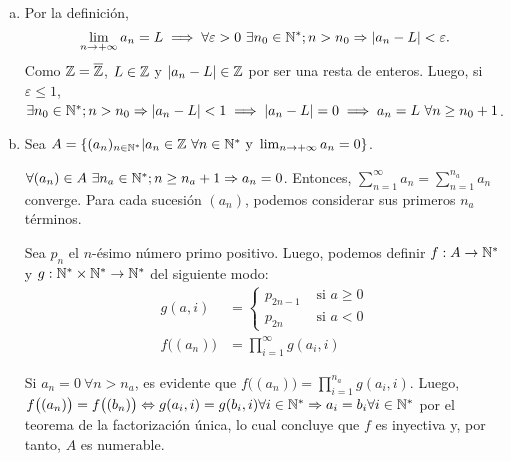 
\hfill

\begin{enumerate}[a)]
	
	\item
		Por la definición,
		$$\limite{n}{a_n}=L \implies \forall\varepsilon>0\ \exists n_0\in\N; n>n_0\Rightarrow |a_n-L|<\varepsilon .$$
		Como $\mathbb{Z}=\overline{\mathbb{Z}}$, $L\in\mathbb{Z}$ y $|a_n-L|\in\mathbb{Z}$ por ser una resta de enteros.
		Luego, si $\varepsilon\leq 1$, $\exists n_0\in\mathbb{N}^*; n>n_0\Rightarrow |a_n-L|<1 \implies |a_n-L| = 0 \implies a_n=L\ \forall n\geq n_0+1$.
	
	\item
		Sea $A = \set{(a_n)_{n\in\N}|a_n\in\Z\ \forall n\in\N \text{ y } \limite{n}{a_n}=0}$.

		$\forall (a_n)\in A\ \exists n_a\in\mathbb{N}^*; n\geq n_a+1 \Rightarrow a_n=0$.
		Entonces, $\sum_{n=1}^{\infty}{a_n} = \sum_{n=1}^{n_a}{a_n}$ converge.
		Para cada sucesión $(a_n)$, podemos considerar sus primeros $n_a$ términos.

		Sea $p_n$ el $n$-ésimo número primo positivo. Luego, podemos definir $f:A\to\mathbb{N}^*$ y $g:\mathbb{N}^*\times\mathbb{N}^*\to\mathbb{N}^*$ del siguiente modo:
		\begin{align*}
			g(a,i) &= \left\{
				\begin{aligned}
					p_{2n-1} &\text{ si } a \geq 0 \\
					p_{2n} &\text{ si } a < 0
				\end{aligned}
				\right.
			\\
			f\big((a_n)\big) &= \prod_{i=1}^{\infty}{g(a_i,i)}
		\end{align*}

		Si $a_n = 0\ \forall n > n_a$, es evidente que $f\big((a_n)\big) = \prod_{i=1}^{n_a}{g(a_i,i)}$.
		Luego, $f\big((a_n)\big) = f\big((b_n)\big) \Leftrightarrow g(a_i,i) = g(b_i,i) \forall i\in\mathbb{N}^* \Rightarrow a_i = b_i \forall i\in\mathbb{N}^*$ por el teorema de la factorización única, lo cual concluye que $f$ es inyectiva y, por tanto, $A$ es numerable.

\end{enumerate}